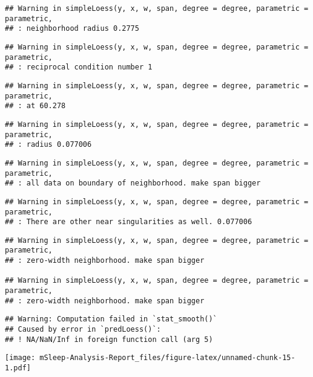 \documentclass[
]{article}
\begin{document}
\begin{verbatim}
## Warning in simpleLoess(y, x, w, span, degree = degree, parametric = parametric,
## : neighborhood radius 0.2775
\end{verbatim}

\begin{verbatim}
## Warning in simpleLoess(y, x, w, span, degree = degree, parametric = parametric,
## : reciprocal condition number 1
\end{verbatim}

\begin{verbatim}
## Warning in simpleLoess(y, x, w, span, degree = degree, parametric = parametric,
## : at 60.278
\end{verbatim}

\begin{verbatim}
## Warning in simpleLoess(y, x, w, span, degree = degree, parametric = parametric,
## : radius 0.077006
\end{verbatim}

\begin{verbatim}
## Warning in simpleLoess(y, x, w, span, degree = degree, parametric = parametric,
## : all data on boundary of neighborhood. make span bigger
\end{verbatim}

\begin{verbatim}
## Warning in simpleLoess(y, x, w, span, degree = degree, parametric = parametric,
## : There are other near singularities as well. 0.077006
\end{verbatim}

\begin{verbatim}
## Warning in simpleLoess(y, x, w, span, degree = degree, parametric = parametric,
## : zero-width neighborhood. make span bigger

## Warning in simpleLoess(y, x, w, span, degree = degree, parametric = parametric,
## : zero-width neighborhood. make span bigger
\end{verbatim}

\begin{verbatim}
## Warning: Computation failed in `stat_smooth()`
## Caused by error in `predLoess()`:
## ! NA/NaN/Inf in foreign function call (arg 5)
\end{verbatim}

\texttt{[image: mSleep-Analysis-Report\_files/figure-latex/unnamed-chunk-15-1.pdf]}
\end{document}
